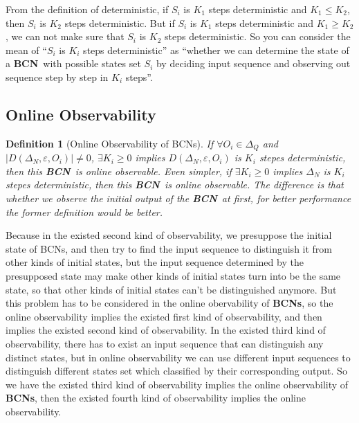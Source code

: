 \documentclass[letterpaper, 10 pt, conference]{ieeeconf}  %
\newtheorem{definition}{Definition}
\def \BCN {{\bf BCN}}
\begin{document}
From the definition of deterministic, if $S_i$ is $K_1$ steps deterministic and $K_1\leq K_2$, then $S_i$ is $K_2$ steps deterministic. But if $S_i$ is $K_1$ steps deterministic and $K_1\geq K_2$, we can not make sure that $S_i$ is $K_2$ steps deterministic. So you can consider the mean of ``$S_i$ is $K_i$ steps deterministic'' as ``whether we can determine the state of a \BCN\ with possible states set $S_i$ by deciding input sequence and observing out sequence step by step in $K_i$ steps''.
\subsection{Online Observability}
\begin{definition}[Online Observability of  BCNs]
If $\forall  O_i\in \Delta_Q$ and $|D\left(\Delta_N,\varepsilon, O_i\right)|\neq 0$, $\exists K_i \ge 0$ implies $D\left(\Delta_N,\varepsilon,O_i\right)$ is $K_i$ stepes deterministic, then this \BCN\ is online observable. Even simpler, if $\exists K_i \ge 0$ implies $\Delta_N$ is $K_i$ stepes deterministic, then this \BCN\ is online observable. The difference is that whether we observe the initial output of the \BCN\ at first, for better performance the former definition would be better.
\end{definition}

Because in the existed second kind of observability, we presuppose the initial state of BCNs, and then try to find the input sequence to distinguish it from other kinds of initial states, but the input sequence determined by the presupposed state may make other kinds of initial states turn into be the same state, so that other kinds of initial states can't be distinguished anymore. But this problem has to be considered in the online obervability of {\bf BCNs}, so the online observability implies the existed first kind of observability, and then implies the existed second kind of observability. In the existed third kind of observability, there has to exist an input sequence that can distinguish any distinct states, but in online observability we can use different input sequences to distinguish different states set which classified by their corresponding output. So we have the existed third kind of observability implies the online observability of {\bf BCNs}, then the existed fourth kind of observability implies the online observability.
\end{document}
